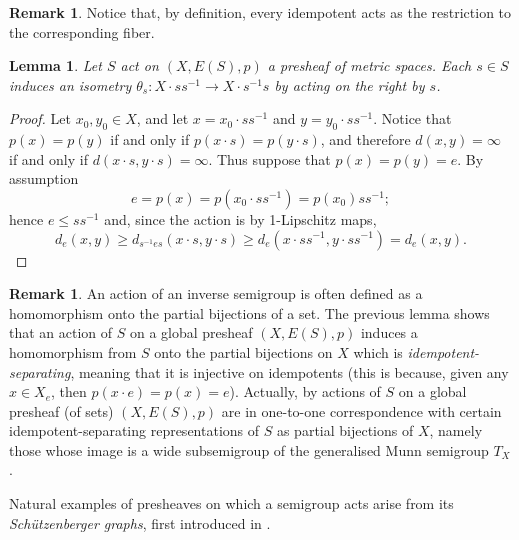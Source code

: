 \documentclass[svgnames]{amsart}
\theoremstyle{plain}
\newtheorem{lem}[thm]{Lemma}
\theoremstyle{definition}
\newtheorem{rem}[thm]{Remark}
\begin{document}
\begin{rem}\label{rem:restriction_is_multiplication}
    Notice that, by definition, every idempotent acts as the restriction to the corresponding fiber.
\end{rem}



\begin{lem} \label{lem:s_induces_isom}
    Let $S$ act on $(X,E(S),p)$ a presheaf of metric spaces. Each $s \in S$ induces an isometry
    $\theta_s \colon X \cdot ss^{-1} \to X \cdot s^{-1}s$ by acting on the right by $s$.
\end{lem}

\begin{proof}
    Let $x_0,y_0\in X$, and let $x=x_0\cdot ss^{-1}$ and $y=y_0\cdot ss^{-1}$. Notice that $p(x) = p(y)$ if and only if
    $p(x \cdot s) = p(y \cdot s)$, and therefore
    $d(x,y) = \infty $ if and only if $d(x \cdot s, y\cdot s) = \infty$.
    Thus suppose that $p(x) = p(y) = e$. By assumption $$e = p(x) = p(x_0 \cdot ss^{-1})
    =p(x_0)ss^{-1};$$ hence
     $e \leq ss^{-1}$ and, since the action is by 1-Lipschitz maps,
    $$d_{e}(x,y) \geq d_{s^{-1}es}(x \cdot s, y\cdot s) \geq d_{e}(x \cdot ss^{-1}, y \cdot ss^{-1}) = d_{e}(x,y).$$
\end{proof}

\begin{rem}
    An action of an inverse semigroup is often defined as a homomorphism onto the partial bijections of a set. The previous lemma shows that an action of $S$ on a global presheaf $(X,E(S),p)$ induces a homomorphism from $S$ onto the partial bijections on $X$ which is \emph{idempotent-separating}, meaning that it is injective on idempotents (this is because, given any $x\in X_e$, then $p(x\cdot e)=p(x)=e$). Actually, by \cite[Theorem D]{tesolin2025generalisationmunnsemigroup} actions of $S$ on a global presheaf (of sets) $(X,E(S),p)$ are in one-to-one correspondence with certain idempotent-separating representations of $S$ as partial bijections of $X$, namely those whose image is a wide subsemigroup of the generalised Munn semigroup $T_X$. 
\end{rem}

\noindent Natural examples of presheaves on which a semigroup acts arise from its \emph{Schützenberger graphs}, first introduced in \cite{stephen1990presentations}. %
\end{document}
